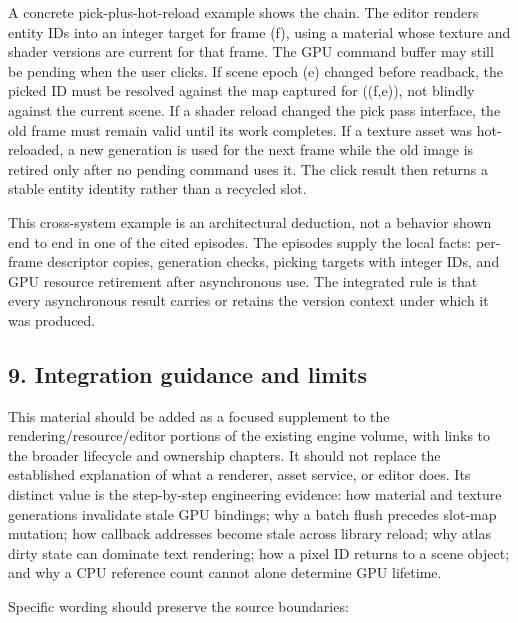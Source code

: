 A concrete pick-plus-hot-reload example shows the chain. The editor renders entity IDs into an integer target for frame (f), using a material whose texture and shader versions are current for that frame. The GPU command buffer may still be pending when the user clicks. If scene epoch (e) changed before readback, the picked ID must be resolved against the map captured for ((f,e)), not blindly against the current scene. If a shader reload changed the pick pass interface, the old frame must remain valid until its work completes. If a texture asset was hot-reloaded, a new generation is used for the next frame while the old image is retired only after no pending command uses it. The click result then returns a stable entity identity rather than a recycled slot.

This cross-system example is an architectural deduction, not a behavior shown end to end in one of the cited episodes. The episodes supply the local facts: per-frame descriptor copies, generation checks, picking targets with integer IDs, and GPU resource retirement after asynchronous use. The integrated rule is that every asynchronous result carries or retains the version context under which it was produced.

\subsection{9. Integration guidance and limits}\label{06-engine-ii-ch041-integration-guidance-and-limits}

This material should be added as a focused supplement to the rendering/resource/editor portions of the existing engine volume, with links to the broader lifecycle and ownership chapters. It should not replace the established explanation of what a renderer, asset service, or editor does. Its distinct value is the step-by-step engineering evidence: how material and texture generations invalidate stale GPU bindings; why a batch flush precedes slot-map mutation; how callback addresses become stale across library reload; why atlas dirty state can dominate text rendering; how a pixel ID returns to a scene object; and why a CPU reference count cannot alone determine GPU lifetime.

Specific wording should preserve the source boundaries:

